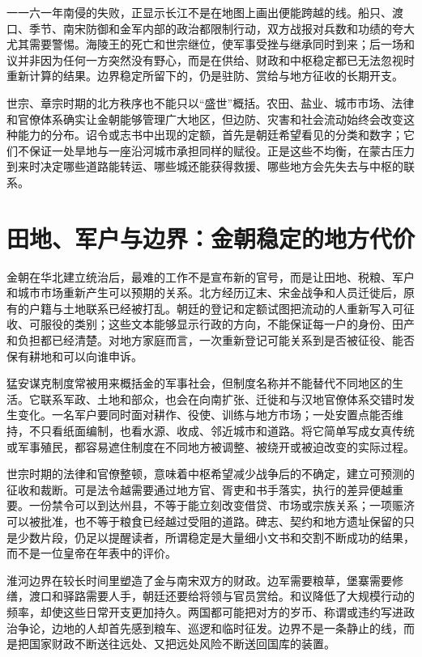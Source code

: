 一一六一年南侵的失败，正显示长江不是在地图上画出便能跨越的线。船只、渡口、季节、南宋防御和金军内部的政治都限制行动，双方战报对兵数和功绩的夸大尤其需要警惕。海陵王的死亡和世宗继位，使军事受挫与继承同时到来；后一场和议并非因为任何一方突然没有野心，而是在供给、财政和中枢稳定都已无法忽视时重新计算的结果。边界稳定所留下的，仍是驻防、赏给与地方征收的长期开支。

世宗、章宗时期的北方秩序也不能只以“盛世”概括。农田、盐业、城市市场、法律和官僚体系确实让金朝能够管理广大地区，但边防、灾害和社会流动始终会改变这种能力的分布。诏令或志书中出现的定额，首先是朝廷希望看见的分类和数字；它们不保证一处旱地与一座沿河城市承担同样的赋役。正是这些不均衡，在蒙古压力到来时决定哪些道路能转运、哪些城还能获得救援、哪些地方会先失去与中枢的联系。

\section{田地、军户与边界：金朝稳定的地方代价}

金朝在华北建立统治后，最难的工作不是宣布新的官号，而是让田地、税粮、军户和城市市场重新产生可以预期的关系。北方经历辽末、宋金战争和人员迁徙后，原有的户籍与土地联系已经被打乱。朝廷的登记和定额试图把流动的人重新写入可征收、可服役的类别；这些文本能够显示行政的方向，不能保证每一户的身份、田产和负担都已经清楚。对地方家庭而言，一次重新登记可能关系到是否被征役、能否保有耕地和可以向谁申诉。

猛安谋克制度常被用来概括金的军事社会，但制度名称并不能替代不同地区的生活。它联系军政、土地和部众，也会在向南扩张、迁徙和与汉地官僚体系交错时发生变化。一名军户要同时面对耕作、役使、训练与地方市场；一处安置点能否维持，不只看纸面编制，也看水源、收成、邻近城市和道路。将它简单写成女真传统或军事殖民，都容易遮住制度在不同地方被调整、被绕开或被迫改变的实际过程。

世宗时期的法律和官僚整顿，意味着中枢希望减少战争后的不确定，建立可预测的征收和裁断。可是法令越需要通过地方官、胥吏和书手落实，执行的差异便越重要。一份禁令可以到达州县，不等于能立刻改变借贷、市场或宗族关系；一项赈济可以被批准，也不等于粮食已经越过受阻的道路。碑志、契约和地方遗址保留的只是少数片段，仍足以提醒读者，所谓稳定是大量细小文书和交割不断成功的结果，而不是一位皇帝在年表中的评价。

淮河边界在较长时间里塑造了金与南宋双方的财政。边军需要粮草，堡寨需要修缮，渡口和驿路需要人手，朝廷还要给将领与官员赏给。和议降低了大规模行动的频率，却使这些日常开支更加持久。两国都可能把对方的岁币、称谓或违约写进政治争论，边地的人却首先感到粮车、巡逻和临时征发。边界不是一条静止的线，而是把国家财政不断送往远处、又把远处风险不断送回国库的装置。

